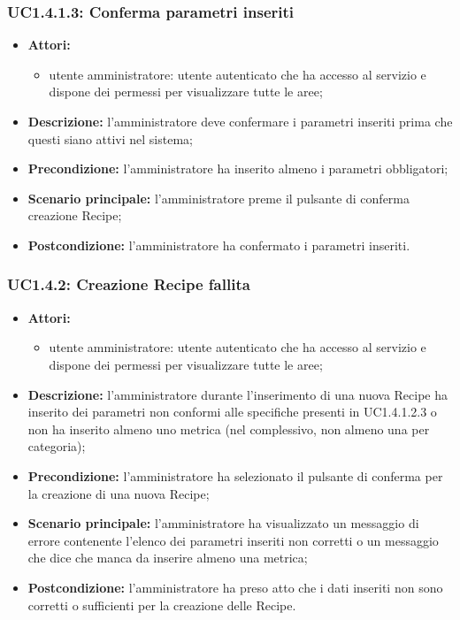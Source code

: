 \subsubsection{UC1.4.1.3: Conferma parametri inseriti}
\begin{itemize}
	\item \textbf{Attori:}
	\begin{itemize}
		\item utente amministratore: utente autenticato che ha accesso al servizio e dispone dei permessi per visualizzare tutte le aree;
	\end{itemize}
	\item \textbf{Descrizione:} l'amministratore deve confermare i parametri inseriti prima che questi siano attivi nel sistema;
	\item \textbf{Precondizione:} l'amministratore ha inserito almeno i parametri obbligatori;
	\item \textbf{Scenario principale:} l'amministratore preme il pulsante di conferma creazione Recipe;
	\item \textbf{Postcondizione:} l'amministratore ha confermato i parametri inseriti.
\end{itemize}

\subsubsection{UC1.4.2: Creazione Recipe fallita}
\begin{itemize}
	\item \textbf{Attori:}
	\begin{itemize}
		\item utente amministratore: utente autenticato che ha accesso al servizio e dispone dei permessi per visualizzare tutte le aree;
	\end{itemize}
	\item \textbf{Descrizione:} l'amministratore durante l'inserimento di una nuova Recipe ha inserito dei parametri non conformi alle specifiche presenti in UC1.4.1.2.3 o non ha inserito almeno uno metrica (nel complessivo, non almeno una per categoria);
	\item \textbf{Precondizione:} l'amministratore ha selezionato il pulsante di conferma per la creazione di una nuova Recipe;
	\item \textbf{Scenario principale:} l'amministratore ha visualizzato un messaggio di errore contenente l'elenco dei parametri inseriti non corretti o un messaggio che dice che manca da inserire almeno una metrica;
	\item \textbf{Postcondizione:} l'amministratore ha preso atto che i dati inseriti non sono corretti o sufficienti per la creazione delle Recipe.
\end{itemize}

